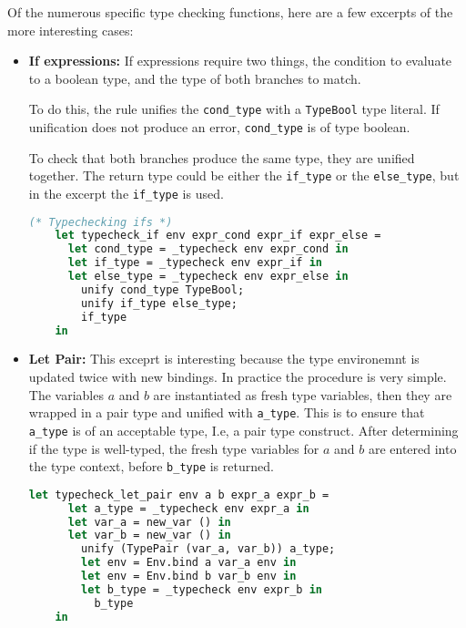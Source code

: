 \documentclass{l4proj}
\begin{document}
Of the numerous specific type checking functions, here are a few excerpts of the more interesting cases:
\begin{itemize}
    \item \textbf{If expressions:}
If expressions require two things, the condition to evaluate to a boolean type, and the type of both branches to match.

To do this, the rule unifies the \texttt{cond\_type} with a \texttt{TypeBool} type literal.
If unification does not produce an error, \texttt{cond\_type} is of type boolean.

To check that both branches produce the same type, they are unified together.
The return type could be either the \texttt{if\_type} or the \texttt{else\_type}, but in the excerpt the \texttt{if\_type} is used.
\begin{lstlisting}[language=Caml, caption=PyFunc Typechecker's typecheck\_if function. If no error is produced then the provided if-expression code is well-typed.]
    (* Typechecking ifs *)
    let typecheck_if env expr_cond expr_if expr_else = 
      let cond_type = _typecheck env expr_cond in
      let if_type = _typecheck env expr_if in 
      let else_type = _typecheck env expr_else in
        unify cond_type TypeBool;
        unify if_type else_type;
        if_type
    in
\end{lstlisting}



    \item \textbf{Let Pair:}
    This exceprt is interesting because the type environemnt is updated twice with new bindings.
    In practice the procedure is very simple.
    The variables $a$ and $b$ are instantiated as fresh type variables, then they are wrapped in a pair type and unified with \texttt{a\_type}.
    This is to ensure that \texttt{a\_type} is of an acceptable type, I.e, a pair type construct.
    After determining if the type is well-typed, the fresh type variables for $a$ and $b$ are entered into the type context, before \texttt{b\_type} is returned.
    \begin{lstlisting}[language=Caml, caption=PyFunc Typechecker's typecheck\_let\_pair function. If no error is produced then the provided let-pair code is well-typed.]
    let typecheck_let_pair env a b expr_a expr_b =
      let a_type = _typecheck env expr_a in
      let var_a = new_var () in
      let var_b = new_var () in
        unify (TypePair (var_a, var_b)) a_type;
        let env = Env.bind a var_a env in
        let env = Env.bind b var_b env in
        let b_type = _typecheck env expr_b in
          b_type
    in
    \end{lstlisting}




\end{itemize}
\end{document}

